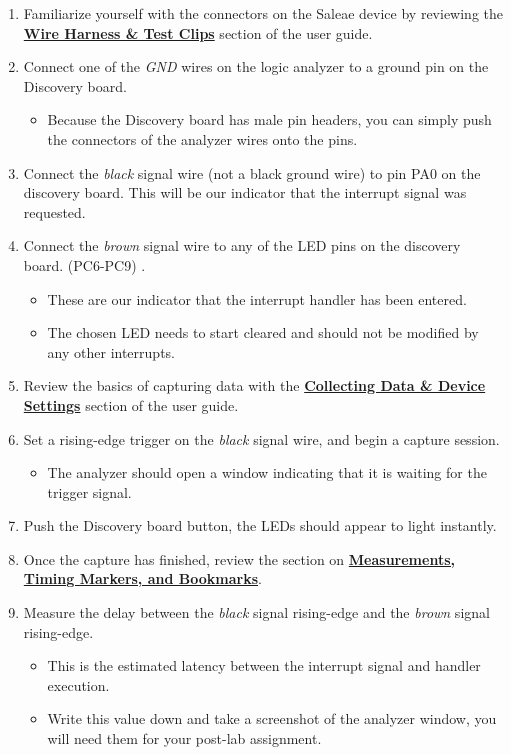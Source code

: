 \documentclass[11pt,fleqn]{book} %
\begin{document}
 
 \begin{enumerate}
     \item Familiarize yourself with the connectors on the Saleae device by reviewing the \href{http://support.saleae.com/hc/en-us/articles/210244483-Wire-Harness-Test-Clips}{\textbf{Wire Harness \& Test Clips}} section of the user guide.
     \item Connect one of the \textit{GND} wires on the logic analyzer to a ground pin on the Discovery board.
     \begin{itemize}
         \item Because the Discovery board has male pin headers, you can simply push the connectors of the analyzer wires onto the pins. 
     \end{itemize}
     \item Connect the \textit{black} signal wire (not a black ground wire) to pin PA0 on the discovery board. This will be our indicator that the interrupt signal was requested. 
     \item Connect the \textit{brown} signal wire to any of the LED pins on the discovery board. (PC6-PC9) . 
     \begin{itemize}
         \item These are our indicator that the interrupt handler has been entered.
         \item The chosen LED needs to start cleared and should not be modified by any other interrupts. 
     \end{itemize}
     
     \item Review the basics of capturing data with the \href{http://suppsort.saleae.com/hc/en-us/articles/210244503-Collecting-Data-Device-Settings}{\textbf{Collecting Data \& Device Settings}} section of the user guide.
     \item Set a rising-edge trigger on the \textit{black} signal wire, and begin a capture session.
     \begin{itemize}
         \item The analyzer should open a window indicating that it is waiting for the trigger signal. 
     \end{itemize}
     \item Push the Discovery board button, the LEDs should appear to light instantly. 
     \item Once the capture has finished, review the section on  \href{http://support.saleae.com/hc/en-us/articles/210244513-Measurements-Timing-Markers-and-Bookmarks}{\textbf{Measurements, Timing Markers, and Bookmarks}}.
     \item Measure the delay between the \textit{black} signal rising-edge and the \textit{brown} signal rising-edge. 
     \begin{itemize}
         \item This is the estimated latency between the interrupt signal and handler execution.
         \item Write this value down and take a screenshot of the analyzer window, you will need them for your post-lab assignment.
     \end{itemize}
 \end{enumerate}
\end{document}
